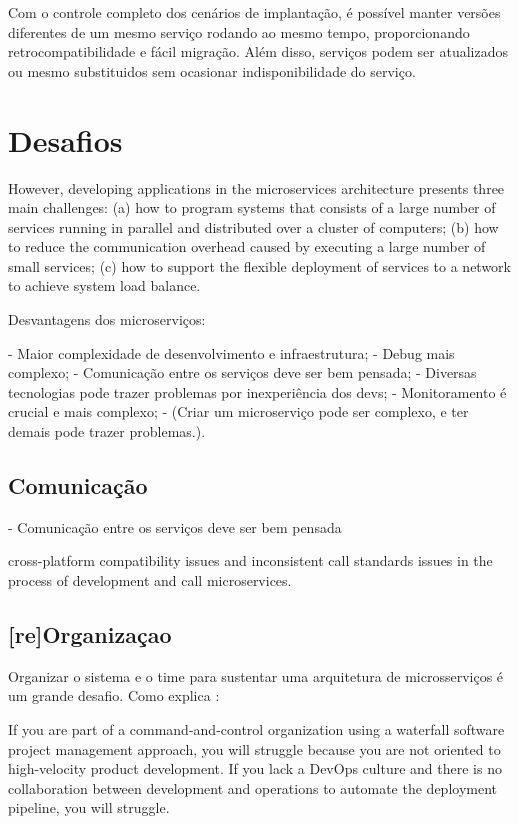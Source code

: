 Com o controle completo dos cenários de implantação, é possível manter versões diferentes de um mesmo serviço rodando ao mesmo tempo, proporcionando retrocompatibilidade e fácil migração. Além disso, serviços podem ser atualizados ou mesmo substituidos sem ocasionar indisponibilidade do serviço. \cite{Familiar2015}


\section{Desafios}

However, developing applications in the microservices architecture presents three main challenges: (a) how to program systems that consists of a large number of services running in parallel and distributed over a cluster of computers; (b) how to reduce the communication overhead caused by executing a large number of small services; (c) how to support the flexible deployment of services to a network to achieve system load balance. \cite{CAOPLE}

Desvantagens dos microserviços:

- Maior complexidade de desenvolvimento e infraestrutura;
- Debug mais complexo;
- Comunicação entre os serviços deve ser bem pensada;
- Diversas tecnologias pode trazer problemas por inexperiência dos devs;
- Monitoramento é crucial e mais complexo;
- (Criar um microserviço pode ser complexo, e ter demais pode trazer problemas.).

\subsection{Comunicação}

- Comunicação entre os serviços deve ser bem pensada

cross-platform compatibility issues and inconsistent call standards issues in the process of development and call microservices. \cite{ZUO2020102878}

\subsection{[re]Organizaçao}

Organizar o sistema e o time para sustentar uma arquitetura de microsserviços é um grande desafio. Como explica : 
\begin{citacao}
    If you are part of a command-and-control organization using a waterfall software project management approach, you will struggle because you are not oriented to high-velocity product development. If you lack a DevOps culture and there is no collaboration between development and operations to automate the deployment pipeline, you will struggle. \cite{Familiar2015}
\end{citacao}

